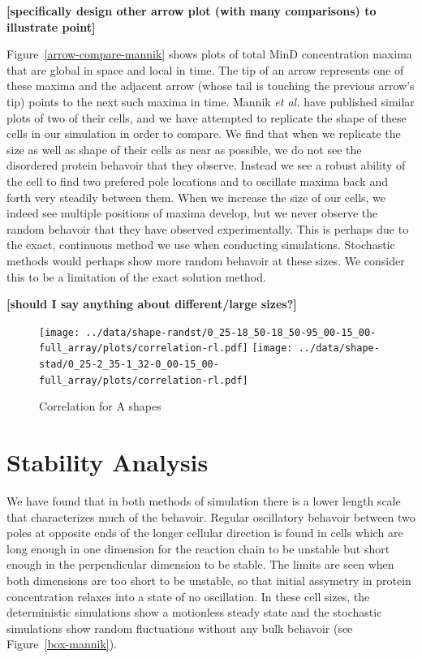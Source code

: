 \documentclass[letterpaper,twocolumn,amsmath,amssymb,pre]{revtex4-1}
\newcommand{\red}[1]{{\bf \color{red} #1}}
\newcommand{\fixme}[1]{\red{[#1]}}
\begin{document}
\fixme{specifically design other arrow plot (with many comparisons) to
  illustrate point}


Figure~\ref{arrow-compare-mannik} shows plots of total MinD
concentration maxima that are global in space and local in time.  The
tip of an arrow represents one of these maxima and the adjacent arrow
(whose tail is touching the previous arrow's tip) points to the next
such maxima in time.  Mannik \emph{et al.} have published similar
plots of two of their cells, and we have attempted to replicate the
shape of these cells in our simulation in order to compare.  We find
that when we replicate the size as well as shape of their cells as
near as possible, we do not see the disordered protein behavoir that
they observe.  Instead we see a robust ability of the cell to find two
prefered pole locations and to oscillate maxima back and forth very
steadily between them.  When we increase the size of our cells, we
indeed see multiple positions of maxima develop, but we never observe
the random behavoir that they have observed experimentally.  This is
perhaps due to the exact, continuous method we use when conducting
simulations.  Stochastic methods would perhaps show more random
behavoir at these sizes.  We consider this to be a limitation of the
exact solution method.

\fixme{should I say anything about different/large sizes?}

\begin{figure}
  \texttt{[image: ../data/shape-randst/0\_25-18\_50-18\_50-95\_00-15\_00-full\_array/plots/correlation-rl.pdf]}
  \texttt{[image: ../data/shape-stad/0\_25-2\_35-1\_32-0\_00-15\_00-full\_array/plots/correlation-rl.pdf]}
  \caption{Correlation for A shapes}
  \label{corr-A}
\end{figure}


\section{Stability Analysis}
\label{sec:stability-analysis}
We have found that in both methods of simulation there is a lower
length scale that characterizes much of the behavoir.  Regular
oscillatory behavoir between two poles at opposite ends of the longer
cellular direction is found in cells which are long enough in one
dimension for the reaction chain to be unstable but short enough in
the perpendicular dimension to be stable.  The limits are seen when
both dimensions are too short to be unstable, so that initial
assymetry in protein concentration relaxes into a state of no
oscillation.  In these cell sizes, the deterministic simulations show
a motionless steady state and the stochastic simulations show random
fluctuations without any bulk behavoir (see Figure~\ref{box-mannik}).
\end{document}
